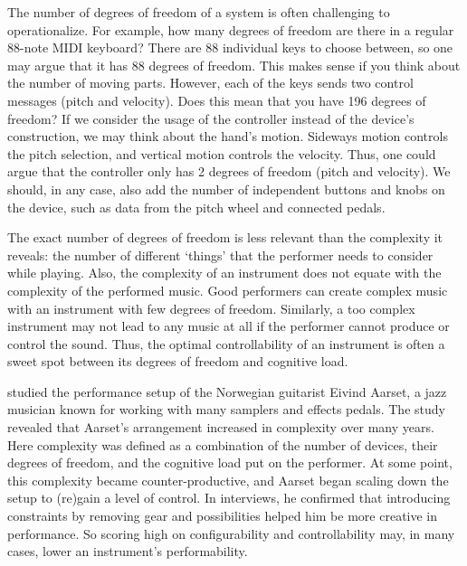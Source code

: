 The number of degrees of freedom of a system is often challenging to operationalize. For example, how many degrees of freedom are there in a regular 88-note MIDI keyboard? There are 88 individual keys to choose between, so one may argue that it has 88 degrees of freedom. This makes sense if you think about the number of moving parts. However, each of the keys sends two control messages (pitch and velocity). Does this mean that you have 196 degrees of freedom? If we consider the usage of the controller instead of the device's construction, we may think about the hand's motion. Sideways motion controls the pitch selection, and vertical motion controls the velocity. Thus, one could argue that the controller only has 2 degrees of freedom (pitch and velocity). We should, in any case, also add the number of independent buttons and knobs on the device, such as data from the pitch wheel and connected pedals.

The exact number of degrees of freedom is less relevant than the complexity it reveals: the number of different `things' that the performer needs to consider while playing. Also, the complexity of an instrument does not equate with the complexity of the performed music. Good performers can create complex music with an instrument with few degrees of freedom. Similarly, a too complex instrument may not lead to any music at all if the performer cannot produce or control the sound. Thus, the optimal controllability of an instrument is often a sweet spot between its degrees of freedom and cognitive load.

\citet{fagereng_levende_2008} studied the performance setup of the Norwegian guitarist Eivind Aarset, a jazz musician known for working with many samplers and effects pedals. The study revealed that Aarset's arrangement increased in complexity over many years. Here complexity was defined as a combination of the number of devices, their degrees of freedom, and the cognitive load put on the performer. At some point, this complexity became counter-productive, and Aarset began scaling down the setup to (re)gain a level of control. In interviews, he confirmed that introducing constraints by removing gear and possibilities helped him be more creative in performance. So scoring high on configurability and controllability may, in many cases, lower an instrument's performability.

